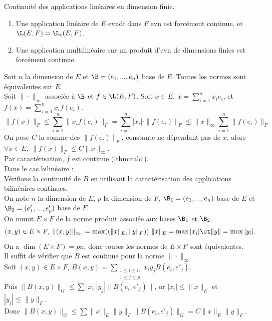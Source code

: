 \documentclass[11pt]{article}
\begin{document}
\begin{thm}{Continuité des applications linéaires en dimension finie.}{}
    \begin{enumerate}
        \item Une application linéaire de $E$ evndf dans $F$ evn est forcément continue, et $\L(E,F)=\L_c(E,F)$.
        \item Une application multilinéaire sur un produit d'evn de dimensions finies est forcément continue.
    \end{enumerate}
    \tcblower
     Soit $n$ la dimension de $E$ et $\B=(e_1,...,e_n)$ base de $E$. Toutes les normes sont équivalentes sur $E$.\\
    Soit $\|\cdot\|_\infty$ associée à $\B$ et $f\in\L(E,F)$. Soit $x\in E, ~ x = \sum_{i=1}^nx_ie_i$, et $f(x)=\sum_{i=1}^nx_if(e_i)$.
    \begin{equation*}
        \|f(x)\|_F \leq \sum_{i=1}^n\|x_if(e_i)\|_F = \sum_{i=1}^n|x_i|\cdot\|f(e_i)\|_F \leq \|x\|_{\infty}\sum_{i=1}^n\|f(e_i)\|_F
    \end{equation*}
    On pose $C$ la somme des $\|f(e_i)\|_F$, constante ne dépendant pas de $x$, alors $\forall x \in E, ~ \|f(x)\|_F \leq C\|x\|_\infty$.\\
    Par caractérisation, $f$ est continue (\ref{thm:calc}).\\
     Dans le cas bilinéaire :\\
    Vérifions la continuité de $B$ en utilisant la caractérisation des applications bilinéaires continues.\\
    On note $n$ la dimension de $E$, $p$ la dimension de $F$, $\B_1=(e_1,...,e_n)$ base de $E$ et $\B_2=(e'_1,...,e'_p)$ base de $F$.\\
    On munit $E\times F$ de la norme produit associée aux bases $\B_1$ et $\B_2$.
    \begin{equation*}
        (x,y) \in E \times F, ~ \|(x,y)\|_\infty := \max((\|x\|_E, \|y\|_F)) ~ \|x\|_E = \max|x_i| \et \|y\|=\max|y_i|.
    \end{equation*}
    On a $\dim(E\times F)=pn$, donc toutes les normes de $E\times F$ sont équivalentes.\\
    Il suffit de vérifier que $B$ est continue pour la norme $\|\cdot\|_\infty$.\\
    Soit $(x,y)\in E\times F$, $B(x,y)=\sum_{\substack{1\leq i \leq n\\1\leq j \leq p}}x_iy_jB(e_i,e'_j)$.\\
    Puis $\|B(x,y)\|_G\leq\sum|x_i||y_j|\|B(e_i,e'_j)\|$, or $|x_i|\leq\|x\|_E$ et $|y_j|\leq\|y\|_F$.\\
    Donc $\|B(x,y)\|_G \leq \sum\|x\|_E\|y\|_F\|B(e_i,e'_j)\|_G=C\|x\|_E\|y\|_F$.
\end{thm}
\end{document}
